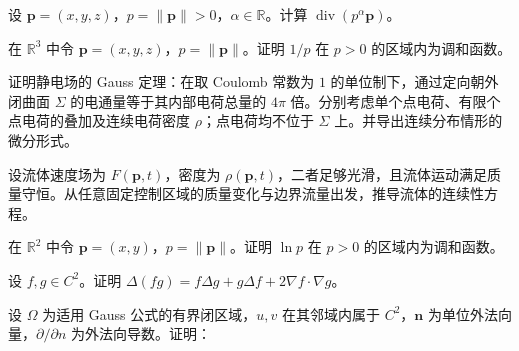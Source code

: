 \noindent\begin{minipage}{\textwidth}
设 $\mathbf p=(x,y,z)$，$p=\|\mathbf p\|>0$，$\alpha\in\mathbb R$。计算 $\operatorname{div}(p^\alpha\mathbf p)$。
\end{minipage}\par\vfill
\noindent\begin{minipage}{\textwidth}
在 $\mathbb R^3$ 中令 $\mathbf p=(x,y,z)$，$p=\|\mathbf p\|$。证明 $1/p$ 在 $p>0$ 的区域内为调和函数。
\end{minipage}\par\vfill
\newpage
\noindent\begin{minipage}{\textwidth}
证明静电场的 Gauss 定理：在取 Coulomb 常数为 $1$ 的单位制下，通过定向朝外闭曲面 $\Sigma$ 的电通量等于其内部电荷总量的 $4\pi$ 倍。分别考虑单个点电荷、有限个点电荷的叠加及连续电荷密度 $\rho$；点电荷均不位于 $\Sigma$ 上。并导出连续分布情形的微分形式。
\end{minipage}\par\vfill
\noindent\begin{minipage}{\textwidth}
设流体速度场为 $F(\mathbf p,t)$，密度为 $\rho(\mathbf p,t)$，二者足够光滑，且流体运动满足质量守恒。从任意固定控制区域的质量变化与边界流量出发，推导流体的连续性方程。
\end{minipage}\par\vfill
\noindent\begin{minipage}{\textwidth}
在 $\mathbb R^2$ 中令 $\mathbf p=(x,y)$，$p=\|\mathbf p\|$。证明 $\ln p$ 在 $p>0$ 的区域内为调和函数。
\end{minipage}\par\vfill
\newpage
\noindent\begin{minipage}{\textwidth}
设 $f,g\in C^2$。证明 $\Delta(fg)=f\Delta g+g\Delta f+2\nabla f\cdot\nabla g$。
\end{minipage}\par\vfill
\noindent\begin{minipage}{\textwidth}
设 $\Omega$ 为适用 Gauss 公式的有界闭区域，$u,v$ 在其邻域内属于 $C^2$，$\mathbf n$ 为单位外法向量，$\partial/\partial n$ 为外法向导数。证明：
\end{minipage}\par\vfill
